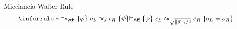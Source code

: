 \begin{frame}{Micciancio-Walter Rule}
  \[
    \inferrule*{
      \vDash_{\mathsf{Pyth}}\{\varphi\}\;
        c_L\approx_{\vec{s}} c_R\;\{\psi\}
    }{
      \vDash_{\mathsf{AE}}\{\varphi\}\;
        c_L\approx_{\sqrt{\|\vec{s}\|_1/2}}c_R\;
        \{o_L=o_R\}
    }
  \]
\end{frame}
